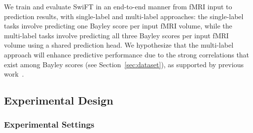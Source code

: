 \documentclass[runningheads,a4paper]{llncs}
\begin{document}
We train and evaluate SwiFT in an end-to-end manner from fMRI input to prediction results, with single-label and multi-label approaches: the single-label tasks involve predicting one Bayley score per input fMRI volume, while the multi-label tasks involve predicting all three Bayley scores per input fMRI volume using a shared prediction head. We hypothesize that the multi-label approach will enhance predictive performance due to the strong correlations that exist among Bayley scores (see Section~\ref{sec:dataset}), as supported by previous work~\cite{He2020}.

\subsection{Experimental Design}
\label{sec:experimental_design}

%

%



\subsubsection{Experimental Settings}
\label{sec:experimental_settings}
\end{document}

